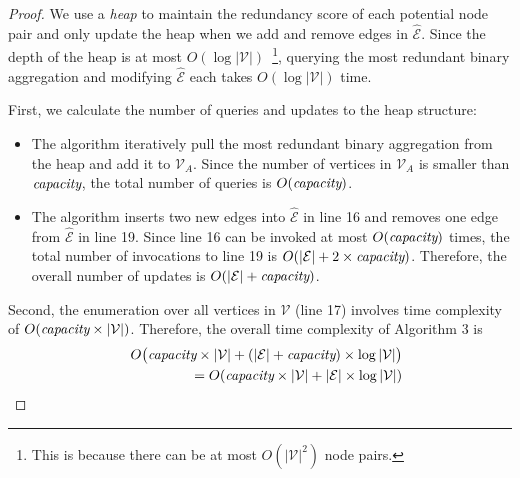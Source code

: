 \documentclass{article}
\newcommand{\er}[1]{\mbox{\rm\em #1}}
\newcommand{\mw}[1] {\mathcal{\widehat{#1}}}
\newcommand{\m}[1] {\mathcal{#1}}
\begin{document}
\begin{proof}
We use a {\em heap} to maintain the redundancy score of each potential node pair and only update the heap when we add and remove edges in $\mw{E}$.
Since the depth of the heap is at most $O(\log|\m{V}|)$~\footnote{This is because there can be at most $O(|\m{V}|^2)$ node pairs.}, querying the most redundant binary aggregation and modifying $\mw{E}$ each takes $O(\log|\m{V}|)$ time.

First, we calculate the number of queries and updates to the heap structure:
\begin{itemize}
\item The algorithm iteratively pull the most redundant binary aggregation from the heap and add it to $\m{V}_A$. Since the number of vertices in $\m{V}_A$ is smaller than $\er{capacity}$, the total number of queries is $O(\er{capacity})$.
\item The algorithm inserts two new edges into $\mw{E}$ in line 16 and removes one edge from $\mw{E}$ in line 19. Since line 16 can be invoked at most $O(\er{capacity})$ times, the total number of invocations to line 19 is $O(|\m{E}| + 2\times \er{capacity})$. Therefore, the overall number of updates is $O(|\m{E}| + \er{capacity})$.
\end{itemize}

Second, the enumeration over all vertices in $\m{V}$ (line 17) involves time complexity of $O(\er{capacity} \times |\m{V}|)$. Therefore, the overall time complexity of Algorithm 3 is 
\begin{eqnarray*}
& & O\big(\er{capacity} \times |\m{V}| + (|\m{E}| + \er{capacity} ) \times \log|\m{V}|\big) \\
& & = O(\er{capacity} \times |\m{V}| + |\m{E}| \times \log|\m{V}|)
\end{eqnarray*}
\end{proof}



\end{document}
